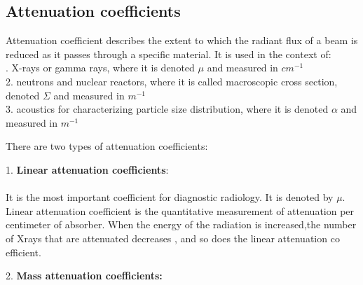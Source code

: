 \documentclass[12pt,a4paper]{article}%
\begin{document}
\begin{flushleft}
		
		\subsection{Attenuation coefficients} 
		\begin{flushleft}
			Attenuation coefficient describes the extent to which the radiant flux of a beam is reduced as it passes through a specific material. It is used in the context of:\\. X-rays or gamma rays, where it is denoted $\mu$ and measured in $cm^{-1}$\\
			2. neutrons and nuclear reactors, where it is called macroscopic cross section, denoted $\Sigma$ and measured in $m^{-1}$ \\
			3. acoustics for characterizing particle size distribution, where it is denoted $\alpha$ and measured in $m^{-1}$\\\bigskip
		\end{flushleft}
		There are  two types of attenuation coefficients:\\\bigskip
		
		1. \textbf{Linear attenuation coefficients}:
		\paragraph{}
		It is the most important coefficient for diagnostic radiology. It is denoted by $\mu$. Linear attenuation coefficient is the quantitative measurement of attenuation per
		centimeter of absorber. When the energy of the radiation is increased,the number of Xrays
		that are attenuated decreases , and so does the linear attenuation
		co efficient.\\\bigskip 
		
		2. \textbf{Mass attenuation coefficients:} 

\end{flushleft}
\end{document}
